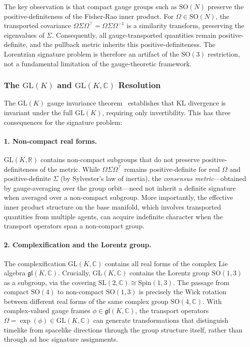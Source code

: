 \documentclass[11pt]{article}
\begin{document}
The key observation is that compact gauge groups such as $\mathrm{SO}(N)$ preserve the positive-definiteness of the Fisher-Rao inner product. For $\Omega \in \mathrm{SO}(N)$, the transported covariance $\Omega \Sigma \Omega^\top = \Omega \Sigma \Omega^{-1}$ is a similarity transform, preserving the eigenvalues of $\Sigma$. Consequently, all gauge-transported quantities remain positive-definite, and the pullback metric inherits this positive-definiteness. The Lorentzian signature problem is therefore an artifact of the $\mathrm{SO}(3)$ restriction, not a fundamental limitation of the gauge-theoretic framework.

\subsubsection{The $\mathrm{GL}(K)$ and $\mathrm{GL}(K, \mathbb{C})$ Resolution}

The $\mathrm{GL}(K)$ gauge invariance theorem~\cite{Dennis2026GL} establishes that KL divergence is invariant under the full $\mathrm{GL}(K)$, requiring only invertibility. This has three consequences for the signature problem:

\paragraph{1. Non-compact real forms.} $\mathrm{GL}(K, \mathbb{R})$ contains non-compact subgroups that do not preserve positive-definiteness of the metric. While $\Omega \Sigma \Omega^\top$ remains positive-definite for real $\Omega$ and positive-definite $\Sigma$ (by Sylvester's law of inertia), the \emph{consensus metric}---obtained by gauge-averaging over the group orbit---need not inherit a definite signature when averaged over a non-compact subgroup. More importantly, the effective inner product structure on the base manifold, which involves transported quantities from multiple agents, can acquire indefinite character when the transport operators span a non-compact group.

\paragraph{2. Complexification and the Lorentz group.} The complexification $\mathrm{GL}(K, \mathbb{C})$ contains all real forms of the complex Lie algebra $\mathfrak{gl}(K, \mathbb{C})$. Crucially, $\mathrm{GL}(K, \mathbb{C})$ contains the Lorentz group $\mathrm{SO}(1,3)$ as a subgroup, via the covering $\mathrm{SL}(2, \mathbb{C}) \cong \mathrm{Spin}(1,3)$. The passage from compact $\mathrm{SO}(4)$ to non-compact $\mathrm{SO}(1,3)$ is precisely the Wick rotation between different real forms of the same complex group $\mathrm{SO}(4, \mathbb{C})$. With complex-valued gauge frames $\phi \in \mathfrak{gl}(K, \mathbb{C})$, the transport operators $\Omega = \exp(\phi) \in \mathrm{GL}(K, \mathbb{C})$ can generate transformations that distinguish timelike from spacelike directions through the group structure itself, rather than through ad hoc signature assignments.
\end{document}
